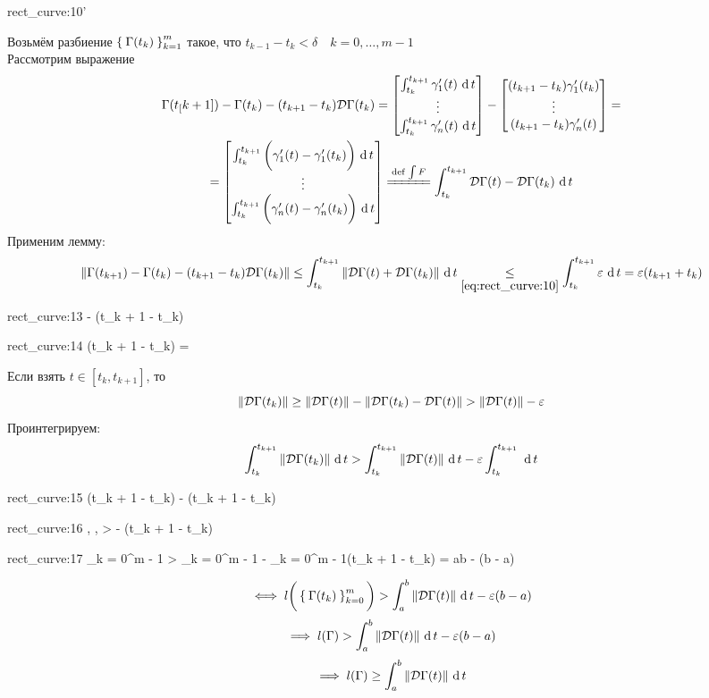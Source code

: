 \begin{iproof}
\begin{equ}{rect_curve:10'}
	\end{equ}
	Возьмём разбиение $ \seq[m]{\Gamma(t_k)}k $ такое, что $ t_{k - 1} - t_k < \delta \quad k = 0, \dots, m - 1 $ \\
	Рассмотрим выражение
	\begin{multline}\lbl{rect_curve:11}
		\Gamma(t_[k + 1]) - \Gamma(t_k) - (t_{k + 1} - t_k)\mc D\Gamma(t_k) = \column{\dint[t]{t_k}{t_{k + 1}}{\gamma_1'(t)}}{\dint[t]{t_k}{t_{k + 1}}{\gamma_n'(t)}} - \column{(t_{k + 1} - t_k)\gamma_1'(t_k)}{(t_{k + 1} - t_k)\gamma_n'(t)} = \\
		= \column{\dint[t]{t_k}{t_{k + 1}}{ \bigg( \gamma_1'(t) - \gamma_1'(t_k) \bigg)}}{\dint[t]{t_k}{t_{k + 1}}{ \bigg( \gamma_n'(t) - \gamma_n'(t_k) \bigg)}} \bdefeq{\int F} \dint[t]{t_k}{t_{k + 1}}{\mc D\Gamma(t) - \mc D\Gamma(t_k)}
	\end{multline}
	Применим лемму:
	$$ \norm{\Gamma(t_{k + 1}) - \Gamma(t_k) - (t_{k + 1} - t_k)\mc D\Gamma(t_k)} \le \dint[t]{t_k}{t_{k + 1}}{\norm{\mc D\Gamma(t) + \mc D\Gamma(t_k)}} \underset{\eref{rect_curve:10}}\le \dint[t]{t_k}{t_{k + 1}}\veps = \veps(t_{k + 1} + t_k) $$
	\begin{equ}{rect_curve:13}
		\implies {} \trige {} - \veps (t_{k + 1} - t_k)
	\end{equ}
	\begin{equ}{rect_curve:14}
		(t_{k + 1} - t_k)  = 
	\end{equ}
	Если взять $ t \in [t_k, t_{k + 1}] $, то
	$$ \norm{\mc D \Gamma(t_k)} \ge \norm{\mc D\Gamma(t)} - \norm{\mc D\Gamma(t_k) - \mc D \Gamma(t)} > \norm{\mc D \Gamma(t)} - \veps $$
	Проинтегрируем:
	$$ \dint[t]{t_k}{t_{k + 1}}{\norm{\mc D\Gamma(t_k)}} > \dint[t]{t_k}{t_{k + 1}}{\norm{ \mc D\Gamma(t)}} - \veps \dint[t]{t_k}{t_{k + 1}}{} $$
	\begin{equ}{rect_curve:15}
		(t_{k + 1} - t_k)  \ge {} - \veps(t_{k + 1} - t_k)
	\end{equ}
	\begin{equ}{rect_curve:16}
		, ,  \implies {} >  - \veps(t_{k + 1} - t_k)
	\end{equ}
	\begin{equ}{rect_curve:17}
		\implies \sum_{k = 0}^{m - 1}  > \sum_{k = 0}^{m - 1}  - \veps \sum_{k = 0}^{m - 1}(t_{k + 1} - t_k) = \dint[t]ab{} - \veps(b - a)
	\end{equ}
	$$ \iff l \bigg( \seqz[m]{\Gamma(t_k)}k \bigg) > \dint[t]ab{\norm{\mc D\Gamma(t)}} - \veps(b - a) $$
	$$ \implies l(\Gamma) > \dint[t]ab{\norm{\mc D \Gamma(t)}} - \veps(b - a) $$
	$$ \implies l(\Gamma) \ge \dint[t]ab{\norm{\mc D \Gamma(t)}} $$
\end{iproof}

